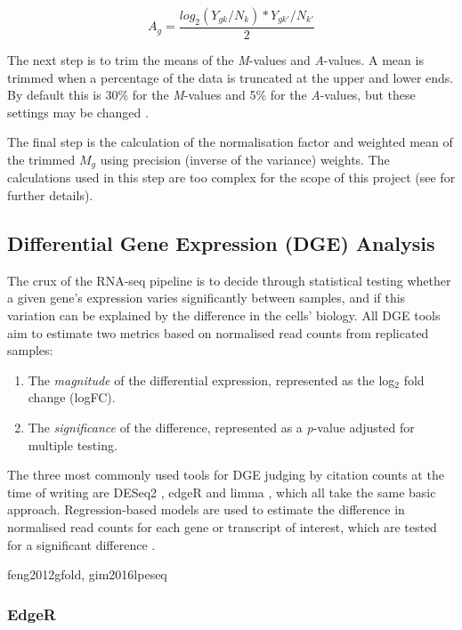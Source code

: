 $$A_g = \frac{log_2(Y_{gk}/N_k)*Y_{gk'}/N_{k'}}{2}$$

The next step is to trim the means of the \textit{M}-values and \textit{A}-values. A mean is trimmed when a percentage of the data is truncated at the upper and lower ends. By default this is 30\% for the \textit{M}-values and 5\% for the \textit{A}-values, but these settings may be changed \citep{robinson2010scaling}. 

The final step is the calculation of the normalisation factor and weighted mean of the trimmed $M_g$ using precision (inverse of the variance) weights. The calculations used in this step are too complex for the scope of this project (see \cite{robinson2010scaling} for further details). 


\subsection{Differential Gene Expression (DGE) Analysis}
The crux of the RNA-seq pipeline is to decide through statistical testing whether a given gene's expression varies significantly between samples, and if this variation can be explained by the difference in the cells' biology. All \ac{DGE} tools aim to estimate two metrics  based on normalised read counts from replicated samples: 

\begin{enumerate}\itemsep-0.5em
\item The \textit{magnitude} of the differential expression, represented as the log$_2$ fold change (logFC).
\item The \textit{significance} of the difference, represented as a \textit{p}-value adjusted for multiple testing.
\end{enumerate} 

The three most commonly used tools for \ac{DGE} judging by citation counts at the time of writing are DESeq2 \citep{love2014moderated}, edgeR \citep{edger} and limma \citep{ritchie2015limma}, which all take the same basic approach. Regression-based models are used to estimate the difference in normalised read counts for each gene or transcript of interest, which are tested for a significant difference \citep{dundar2015introduction}.

feng2012gfold, gim2016lpeseq
\subsubsection{EdgeR}

